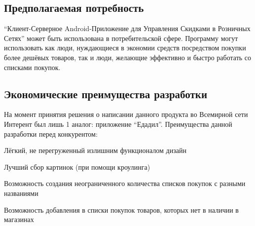 \subsection{Предполагаемая потребность} ``Клиент-Серверное Android-Приложение
для Управления Скидками в Розничных Сетях'' может быть использована в
потребительской сфере. Программу могут использовать как люди, нуждающиеся в
экономии средств посредством покупки более дешёвых товаров, так и люди,
желающие эффективно и быстро работать со списками покупок.

\subsection{Экономические преимущества разработки} На момент принятия решения о
написании данного продукта во Всемирной сети Интерент был лишь 1 аналог:
приложение ``Едадил''.  Преимущества данной разработки перед конкурентом:
\begin{my_enumerate}
\item Лёгкий, не перегруженный излишним функционалом дизайн
\item Лучший сбор картинок (при помощи кроулинга)
\item Возможность создания неограниченного количества списков покупок с разными названиями
\item Возможность добавления в списки покупок товаров, которых нет в наличии в магазинах
\end{my_enumerate}
